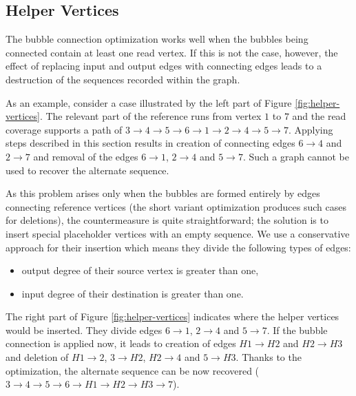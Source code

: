 \subsection{Helper Vertices}
\label{subsec:helper-vertices}

The bubble connection optimization works well when the bubbles being connected contain at least one read vertex. If this is not the case, however, the effect of replacing input and output edges with connecting edges leads to a destruction of the sequences recorded within the graph.

As an example, consider a case illustrated by the left part of Figure \ref{fig:helper-vertices}. The relevant part of the reference runs from vertex $1$ to $7$ and the read coverage supports a path of $3 \to 4 \to 5 \to 6 \to 1 \to 2 \to 4 \to 5 \to 7$. Applying steps described in this section results  in creation of connecting edges $6 \to 4$ and $2 \to 7$ and removal of the edges $6 \to 1$, $2 \to 4$ and $5 \to 7$. Such a graph cannot be used to recover the alternate sequence.

As this problem arises only when the bubbles are formed entirely by edges connecting reference vertices (the short variant optimization produces such cases for deletions), the countermeasure is quite straightforward; the solution is to  insert special placeholder vertices with an empty sequence. We use a conservative approach for their insertion which means they divide the following types of edges:
\begin{itemize}
\item output degree of their source vertex is greater than one,
\item input degree of their destination is greater than one.
\end{itemize}
The right part of Figure \ref{fig:helper-vertices} indicates where the helper vertices would be inserted. They divide edges $6 \to 1$, $2 \to 4$ and $5 \to 7$. If the bubble connection is applied now, it leads to creation of edges $H1 \to H2$ and $H2 \to H3$ and deletion of $H1 \to 2$, $3 \to H2$, $H2 \to 4$ and $5 \to H3$. Thanks to the optimization, the alternate sequence can be now recovered ($3 \to 4 \to 5 \to 6 \to H1 \to H2 \to H3 \to 7$).

